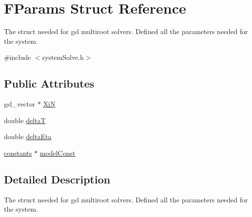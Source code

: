 \hypertarget{structFParams}{
\section{FParams Struct Reference}
\label{structFParams}
}


The struct needed for gsl multiroot solvers. Defined all the parameters needed for the system.  


{\ttfamily \#include $<$systemSolve.h$>$}\subsection*{Public Attributes}
\begin{DoxyCompactItemize}
\item 
gsl\_\-vector $\ast$ \hyperlink{structFParams_abf2e0595af66a5282a7cfc0a9e9d7a9f}{XiN}
\item 
double \hyperlink{structFParams_a60254daf4ee837252884402b9a2653d0}{deltaT}
\item 
double \hyperlink{structFParams_ad53d99b185bdeb67f5b74e19b0596d82}{deltaEta}
\item 
\hyperlink{structconstants}{constants} $\ast$ \hyperlink{structFParams_a9ad4892b4290ef6ab958f273ff174b27}{modelConst}
\end{DoxyCompactItemize}


\subsection{Detailed Description}
The struct needed for gsl multiroot solvers. Defined all the parameters needed for the system. 

